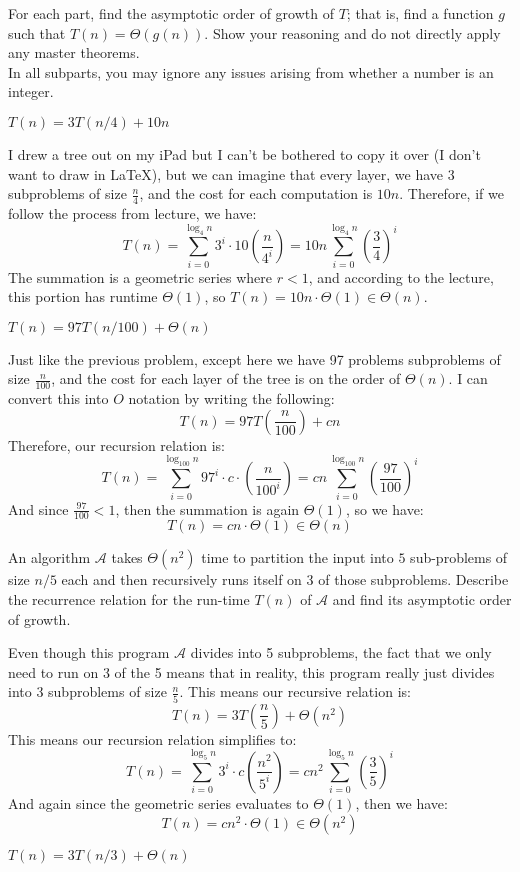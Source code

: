 \documentclass[11pt]{article}
\begin{document}
For each part, find the asymptotic order of growth of $T$; that is, find a function $g$ such that $T(n) = \Theta(g(n))$. Show your reasoning and do not directly apply any master theorems.\\
In all subparts, you may ignore any issues arising from whether a number is an integer.

\begin{subparts}
\subpart \(T(n)=3T(n/4)+10n\)

\begin{solution}
	I drew a tree out on my iPad but I can't be bothered to copy it over (I don't want to draw in \LaTeX), but 
	we can imagine that every layer, we have 3 subproblems of size $\frac{n}{4}$, and the cost for each 
	computation is $10n$. Therefore, if we follow the process from lecture, we have:
	\[
		T(n) = \sum_{i = 0}^{\log_4 n} 3^i \cdot 10\left( \frac{n}{4^i} \right)  = 10n \sum_{i = 0}^{\log_4 n}
		\left( \frac{3}{4} \right)^i
	\] 
	The summation is a geometric series where $r < 1$, and according to the lecture, this portion has 
	runtime $\Theta(1)$, so $T(n) = 10n \cdot \Theta(1) \in \Theta (n)$.
\end{solution}

\subpart \(T(n)=97T(n/100)+ \Theta(n)\)

\begin{solution}
	Just like the previous problem, except here we have 97 problems subproblems of size $\frac{n}{100}$, 
	and the cost for each layer of the tree is on the order of $\Theta(n)$. I can convert this 
	into $O$ notation by writing the following:
	\[
	T(n) = 97T\left( \frac{n}{100} \right) + c n
	\] 
	Therefore, our recursion relation is:
	\[
		T(n) = \sum_{i = 0}^{\log_{100}n} 97^i \cdot c \cdot \left( \frac{n}{100^i} \right) = 
		cn \sum_{i = 0}^{\log_{100}n}\left( \frac{97}{100} \right)^i
	\] 
	And since $\frac{97}{100}< 1$, then the summation is again $\Theta(1)$, so we have:
	\[
	T(n) = cn \cdot \Theta(1) \in \Theta (n)
\]
\end{solution}

\subpart An algorithm $\mathcal{A}$ takes $\Theta(n^2)$ time to partition the input into $5$ sub-problems of size $n/5$ each and then recursively runs itself on $3$ of those subproblems. Describe the recurrence relation for the run-time $T(n)$ of $\mathcal{A}$ and find its asymptotic order of growth. 

\begin{solution}
	Even though this program $\mathcal A $ divides into 5 subproblems, the fact that we only need to run 
	on 3 of the 5 means that in reality, this program really just divides into 3 subproblems of size 
	$\frac{n}{5}$. This means our recursive relation is:
	\[
	T(n) = 3T\left(\frac{n}{5}\right) + \Theta(n^2)
	\] 
	This means our recursion relation simplifies to:
	\[
		T(n) = \sum_{i = 0}^{\log_5n} 3^i \cdot c\left( \frac{n^2}{5^i} \right) = cn^2 \sum_{i = 0}^{\log_5n}
		\left( \frac{3}{5} \right) ^i
	\] 
	And again since the geometric series evaluates to $\Theta(1)$, then we have:
	\[
	T(n) = cn^2 \cdot \Theta(1) \in \Theta(n^2)
	\] 
\end{solution}
\subpart \(T(n)=3T(n/3)+\Theta(n)\)
    

\end{subparts}
\end{document}
